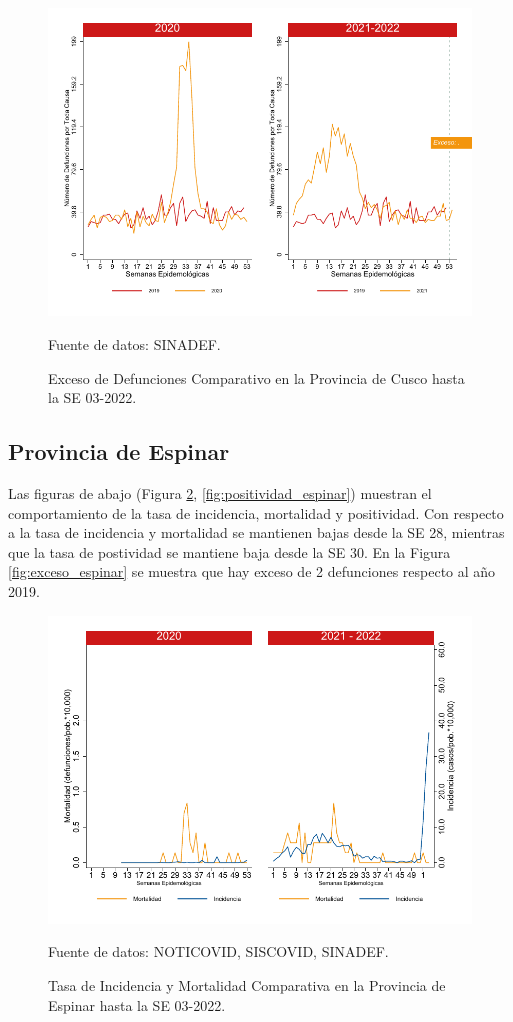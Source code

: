 \documentclass[12pt,a4paper,openany]{book}
\begin{document}
		\begin{figure}[h]
			\caption{Exceso de Defunciones Comparativo en la Provincia de Cusco hasta la SE 03-2022.}\label{fig:exceso_cusco}
			\begin{center}
				\includegraphics[width=0.7\linewidth]{../figuras/exceso_7}
			\end{center}
			{\footnotesize {Fuente de datos: SINADEF.}}
		\end{figure}
		
		\clearpage
		
		\subsection*{Provincia de Espinar}
		\noindent Las figuras de abajo (Figura \ref{fig:inc_mort_espinar}, \ref{fig:positividad_espinar}) muestran el comportamiento de la tasa de incidencia, mortalidad y positividad. Con respecto a la tasa de incidencia y mortalidad se mantienen bajas desde la SE 28, mientras que la tasa de postividad se mantiene baja desde la SE 30. 
		En la Figura \ref{fig:exceso_espinar} se muestra que hay exceso de 2 defunciones respecto al año 2019.
		
		\begin{figure}[h]
			\caption{Tasa de Incidencia y Mortalidad Comparativa en la Provincia de Espinar hasta la SE 03-2022.}\label{fig:inc_mort_espinar}
			\begin{center}
				\includegraphics[width=0.7\linewidth]{../figuras/incidencia_mortalidad_20_21_8}
			\end{center}
			{\footnotesize {Fuente de datos: NOTICOVID, SISCOVID, SINADEF.}}
		\end{figure}
		
\end{document}
